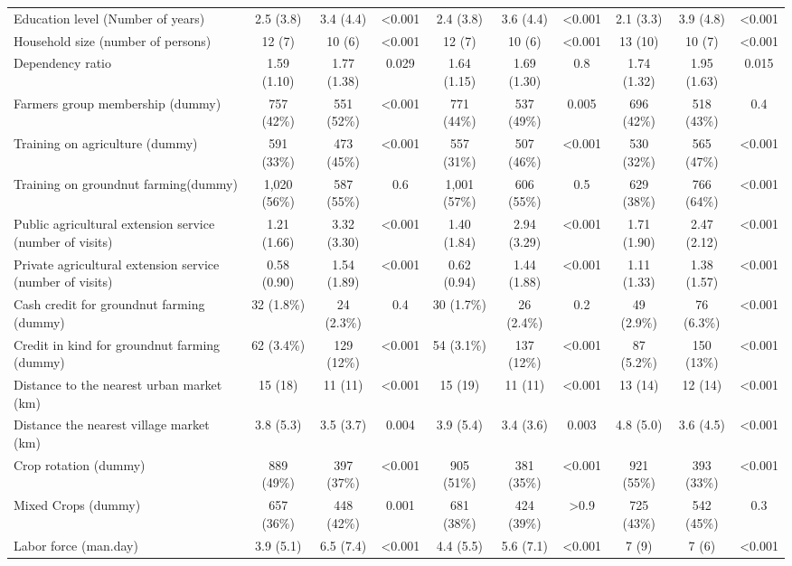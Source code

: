 \documentclass[
]{article}
\begin{document}
\begin{landscape}
\begin{table}[!h]
{\begin{tabular}[t]{lccccccccc}
Education level (Number of years) & 2.5 (3.8) & 3.4 (4.4) & <0.001 & 2.4 (3.8) & 3.6 (4.4) & <0.001 & 2.1 (3.3) & 3.9 (4.8) & <0.001\\
Household size (number of persons) & 12 (7) & 10 (6) & <0.001 & 12 (7) & 10 (6) & <0.001 & 13 (10) & 10 (7) & <0.001\\
Dependency ratio & 1.59 (1.10) & 1.77 (1.38) & 0.029 & 1.64 (1.15) & 1.69 (1.30) & 0.8 & 1.74 (1.32) & 1.95 (1.63) & 0.015\\
Farmers group membership (dummy) & 757 (42\%) & 551 (52\%) & <0.001 & 771 (44\%) & 537 (49\%) & 0.005 & 696 (42\%) & 518 (43\%) & 0.4\\
\addlinespace
Training on agriculture (dummy) & 591 (33\%) & 473 (45\%) & <0.001 & 557 (31\%) & 507 (46\%) & <0.001 & 530 (32\%) & 565 (47\%) & <0.001\\
Training on groundnut farming(dummy) & 1,020 (56\%) & 587 (55\%) & 0.6 & 1,001 (57\%) & 606 (55\%) & 0.5 & 629 (38\%) & 766 (64\%) & <0.001\\
Public agricultural extension service (number of visits) & 1.21 (1.66) & 3.32 (3.30) & <0.001 & 1.40 (1.84) & 2.94 (3.29) & <0.001 & 1.71 (1.90) & 2.47 (2.12) & <0.001\\
Private agricultural extension service (number of visits) & 0.58 (0.90) & 1.54 (1.89) & <0.001 & 0.62 (0.94) & 1.44 (1.88) & <0.001 & 1.11 (1.33) & 1.38 (1.57) & <0.001\\
Cash credit for groundnut farming (dummy) & 32 (1.8\%) & 24 (2.3\%) & 0.4 & 30 (1.7\%) & 26 (2.4\%) & 0.2 & 49 (2.9\%) & 76 (6.3\%) & <0.001\\
\addlinespace
Credit in kind for groundnut farming (dummy) & 62 (3.4\%) & 129 (12\%) & <0.001 & 54 (3.1\%) & 137 (12\%) & <0.001 & 87 (5.2\%) & 150 (13\%) & <0.001\\
Distance to the nearest urban market (km) & 15 (18) & 11 (11) & <0.001 & 15 (19) & 11 (11) & <0.001 & 13 (14) & 12 (14) & <0.001\\
Distance the nearest village market (km) & 3.8 (5.3) & 3.5 (3.7) & 0.004 & 3.9 (5.4) & 3.4 (3.6) & 0.003 & 4.8 (5.0) & 3.6 (4.5) & <0.001\\
Crop rotation (dummy) & 889 (49\%) & 397 (37\%) & <0.001 & 905 (51\%) & 381 (35\%) & <0.001 & 921 (55\%) & 393 (33\%) & <0.001\\
Mixed Crops (dummy) & 657 (36\%) & 448 (42\%) & 0.001 & 681 (38\%) & 424 (39\%) & >0.9 & 725 (43\%) & 542 (45\%) & 0.3\\
\addlinespace
Labor force (man.day) & 3.9 (5.1) & 6.5 (7.4) & <0.001 & 4.4 (5.5) & 5.6 (7.1) & <0.001 & 7 (9) & 7 (6) & <0.001\\

\end{tabular}}
\end{table}
\end{landscape}
\end{document}
